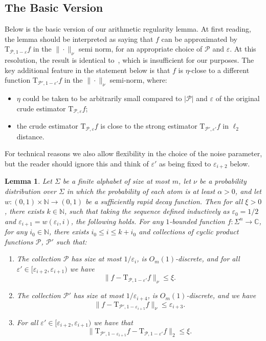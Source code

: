 \documentclass[11pt]{article}
\newtheorem{lemma}[thm]{Lemma}
\newcommand\card[1]{\left| {#1} \right|}
\newcommand\norm[1]{\| #1 \|}
\newcommand\eps{\varepsilon}
\renewcommand\leq{\leqslant}
\begin{document}
\subsection{The Basic Version}
Below is the basic version of our arithmetic regularity lemma. At first reading, the lemma should be interpreted as saying that $f$ can be approximated by $\mathrm{T}_{\mathcal{P},1-\eps}f$  in the $\|\cdot\|_{\nu}$ semi norm, for an appropriate choice of $\mathcal{P}$ and $\eps$. 
At this resolution, the result is identical to~\cite[Lemma 5.3]{BKM5}, which is insufficient for our purposes.
The key additional feature in the statement below is that $f$ is $\eta$-close to a different function  $\mathrm{T}_{\mathcal{P}',1-\eps'} f$ in the $\|\cdot\|_{\nu}$ semi-norm, where:
\begin{itemize}
    \item $\eta$ could be taken to be arbitrarily small compared to $\card{\mathcal{P}}$ and $\eps$ of the original crude estimator $\mathrm{T}_{\mathcal{P},\eps} f$;
    \item the crude estimator $\mathrm{T}_{\mathcal{P},\eps} f$ is close to the strong estimator $\mathrm{T}_{\mathcal{P}',\eps'} f$ in $\ell_2$ distance.
\end{itemize}
For technical reasons we also allow flexibility in the choice of the noise parameter, but the reader should ignore this and think of $\eps'$ as being fixed to $\eps_{i+2}$ below.
\begin{lemma}\label{lem:arithmetic_reg}
    Let $\Sigma$ be a finite alphabet of size at most $m$, let $\nu$ be a probability distribution over $\Sigma$ in which the probability of each atom is at least $\alpha>0$, and let $w\colon (0,1)\times\mathbb{N}\to(0,1)$ be a sufficiently rapid decay function. Then for all $\xi>0$, there exists  $k\in\mathbb{N}$, such that taking the sequence defined inductively as $\eps_0 = 1/2$ and $\eps_{i+1} = w(\eps_i,i)$, the following holds. For any $1$-bounded function $f\colon \Sigma^n\to\mathbb{C}$, for any $i_0\in\mathbb{N}$, there exists $i_0\leq i\leq k+i_0$ and collections of cyclic product functions $\mathcal{P}$, $\mathcal{P}'$ such that:
    \begin{enumerate}
        \item The collection $\mathcal{P}$ has size at most $1/\eps_{i}$, is $O_{m}(1)$-discrete, and for all $\eps'\in [\eps_{i+2},\eps_{i+1})$ we have
        \[
        \norm{f-\mathrm{T}_{\mathcal{P},1-\eps'}f}_{\nu}\leq \xi.
        \] 
        \item The collection $\mathcal{P}'$ has size at most $1/\eps_{i+4}$, is $O_{m}(1)$-discrete, and we have
        \[
        \norm{f-\mathrm{T}_{\mathcal{P}',1-\eps_{i+5}}f}_{\nu}\leq \eps_{i+3}.
        \]
        \item For all $\eps'\in [\eps_{i+2},\eps_{i+1})$ we have that 
        \[
        \norm{\mathrm{T}_{\mathcal{P}',1-\eps_{i+5}}f -\mathrm{T}_{\mathcal{P},1-\eps'} f}_2\leq \xi.
        \]
    \end{enumerate}
\end{lemma}
\end{document}
